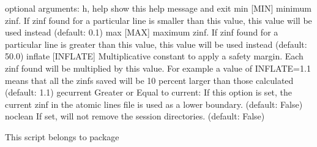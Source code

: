 \documentclass[letterpaper,10pt,english]{sphinxmanual}
\begin{document}
\begin{sphinxVerbatim}[commandchars=\\\{\}]
optional arguments:
  \PYGZhy{}h, \PYGZhy{}\PYGZhy{}help           show this help message and exit
  \PYGZhy{}\PYGZhy{}min [MIN]          minimum zinf. If zinf found for a particular line is
                       smaller than this value, this value will be used
                       instead (default: 0.1)
  \PYGZhy{}\PYGZhy{}max [MAX]          maximum zinf. If zinf found for a particular line is
                       greater than this value, this value will be used
                       instead (default: 50.0)
  \PYGZhy{}\PYGZhy{}inflate [INFLATE]  Multiplicative constant to apply a \PYGZdq{}safety margin\PYGZdq{}.
                       Each zinf found will be multiplied by this value. For
                       example a value of INFLATE=1.1 means that all the
                       zinf\PYGZsq{}s saved will be 10 percent larger than those
                       calculated (default: 1.1)
  \PYGZhy{}\PYGZhy{}ge\PYGZus{}current         \PYGZdq{}Greater or Equal to current\PYGZdq{}: If this option is set,
                       the current zinf in the atomic lines file is used as a
                       lower boundary. (default: False)
  \PYGZhy{}\PYGZhy{}no\PYGZus{}clean           If set, will not remove the session directories.
                       (default: False)
\end{sphinxVerbatim}

This script belongs to package 
\end{document}
